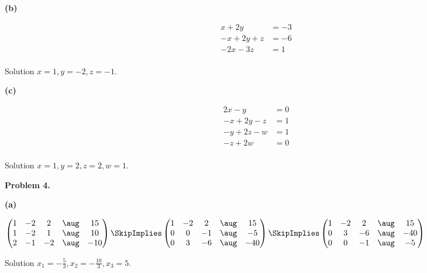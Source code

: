 \documentclass[oneside,12pt]{amsart}
\begin{document}
\medskip

\textbf{(b)}

\begin{align*}
  x + 2y       &= -3 \\
 -x + 2y +  z  &= -6 \\
-2x     - 3z  &=  1 \\
\end{align*}

Solution $x=1, y=-2, z=-1$.

\bigskip


\textbf{(c)}

\begin{align*}
  2x - y          &= 0 \\
 -x + 2y -  z     &= 1 \\
      -y  +2z -w  &= 1 \\
           -z+2w  &= 0 \\
\end{align*}

Solution $x=1, y=2, z=2, w=1$.


\bigskip


\textbf{Problem 4.}

\bigskip

\textbf{(a)}

\bigskip

$
\begin{pmatrix}
1 & -2 & 2 &  \aug &  15 \\
1 & -2 & 1 &  \aug &  10 \\
2 & -1 & -2 & \aug & -10
\end{pmatrix}
\SkipImplies
\begin{pmatrix}
1 & -2 & 2 &  \aug & 15 \\
0 & 0 & -1 &  \aug & -5 \\
0 & 3 & -6 &  \aug & -40
\end{pmatrix}
\SkipImplies
\begin{pmatrix}
1 & -2 & 2 &  \aug & 15 \\
0 & 3 & -6 &  \aug & -40 \\
0 & 0 & -1 &  \aug & -5 \\
\end{pmatrix}
$

\bigskip

Solution $x_1=-\frac{5}{3}, x_2=-\frac{10}{3}, x_3=5$.
\end{document}
